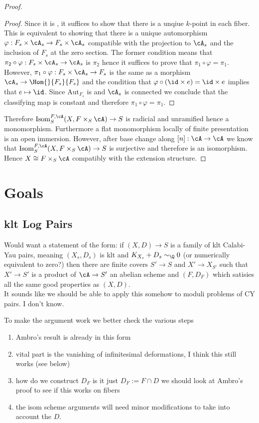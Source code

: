 \documentclass[12pt]{article}
\begin{document}
\begin{proof}
\begin{proof}
Since it is \etale, it suffices to show that there is a unqiue $k$-point in each fiber. This is equivalent to showing that there is a unique automorphism $\varphi : F_s \times \cA_s \to F_s \times \cA_s$ compatible with the projection to $\cA_s$ and the inclusion of $F_s$ at the zero section. The former condition means that $\pi_2 \circ \varphi : F_s \times \cA_s \to \cA_s$ is $\pi_2$ hence it suffices to prove that $\pi_1 \circ \varphi = \pi_1$. However, $\pi_1 \circ \varphi : F_s \times \cA_s \to F_s$ is the same as a morphism $\cA_s \to \Hom{}{F_s}{F_s}$ and the condition that $\varphi \circ (\id \times e) = \id \times e$ implies that $e \mapsto \id$. Since $\mathrm{Aut}_{F_s}$ is \etale and $\cA_s$ is connected we conclude that the classifying map is constant and therefore $\pi_1 \circ \varphi = \pi_1$. 
\end{proof}

Therefore $\Isom_S^{F,\cA}(X, F \times_S \cA) \to S$ is radicial and unramified hence a monomorphism. Furthermore a flat monomorphism locally of finite presentation is an open immersion. However, after base change along $[n] : \cA \to \cA$ we know that $\Isom_S^{F,\cA}(X, F \times_S \cA) \to S$ is surjective and therefore is an isomorphism. Hence $X \cong F \times_S \cA$ compatibly with the extension structure.

\end{proof}

\section{Goals}

\subsection{klt Log Pairs}

Would want a statement of the form: if $(X, D) \to S$ is a family of klt Calabi-Yau pairs, meaning $(X_s, D_s)$ is klt and $K_{X_s} + D_s \sim_{\Q} 0$ (or numerically equivalent to zero?) then there are finite \etale covers $S' \to S$ and $X' \to X_{S'}$ such that $X' \to S'$ is a product of $\cA \to S'$ an abelian scheme and $(F, D_F)$ which satisies all the same good properties as $(X, D)$.
\bigskip\\
It sounds like we should be able to apply this somehow to moduli problems of CY pairs. I don't know.

To make the argument work we better check the various steps
\begin{enumerate}
\item Ambro's result is already in this form
\item vital part is the vanishing of infinitesimal deformations, I think this still works (see below)
\item how do we construct $D_F$ is it just $D_F := F \cap D$ we should look at Ambro's proof to see if this works on fibers
\item the isom scheme arguments will need minor modifications to take into account the $D$.
\end{enumerate}
\end{document}
